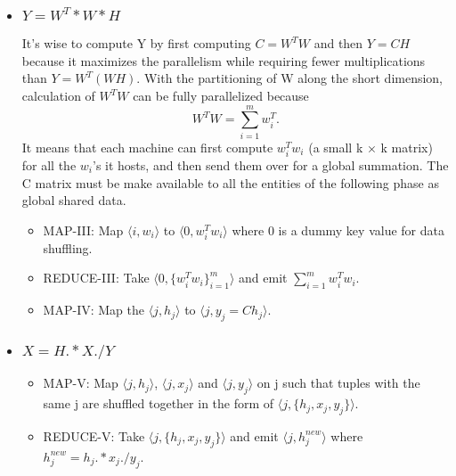 \documentclass[a4paper,12pt]{article}
\begin{document}
\begin{itemize}
\begin{itemize}
\begin{itemize}
         \end{itemize}


     \item \subsubsection{$ Y = W^T * W * H $}
       It's wise to compute Y by first computing $C= W^T W$ and then
       $Y=CH$ because it maximizes the parallelism while requiring
       fewer multiplications than $Y= W^T (W H)$. With the partitioning
       of W along the short dimension, calculation of $ W^T W $ can be
       fully parallelized because $$ W^T W = \sum_{i=1}^{m} w_i^T. $$
       It means that each machine can first compute $w_i^T w_i$  (a
       small k × k matrix) for all the $w_i$’s it hosts, and then send
       them over for a global summation. The C matrix must be make
       available to all the entities of the following phase as global
       shared data.

       \begin{itemize}

         \item MAP-III: Map $\langle i, w_i \rangle$ to  $\langle 0,
           w_i^T w_i \rangle$ where 0 is a dummy key value for data
           shuffling.

          \item REDUCE-III: Take $\langle 0,
           \{w_i^T w_i\}_{i=1}^{m} \rangle $ and emit $\sum_{i=1}^{m} w_i^T w_i$.

         \item MAP-IV: Map the $ \langle j, h_j \rangle$ to $ \langle
           j, y_j = Ch_j \rangle$.

       \end{itemize}


     \item \subsubsection{$ X = H .* X ./ Y $}
       \begin{itemize}

       \item MAP-V: Map $\langle j, h_j \rangle$, $\langle j, x_j
           \rangle$ and $\langle j, y_j \rangle$ on j such that tuples
           with the same j are shuffled together in the form of
           $\langle j, \{h_j, x_j, y_j\} \rangle$.

         \item REDUCE-V: Take $\langle j, \{h_j, x_j, y_j\} \rangle$
            and emit $\langle j, h_j^{new} \rangle$ where $h_j^{new} =
            h_j .* x_j ./ y_j $.


\end{itemize}
\end{itemize}
\end{itemize}
\end{document}
